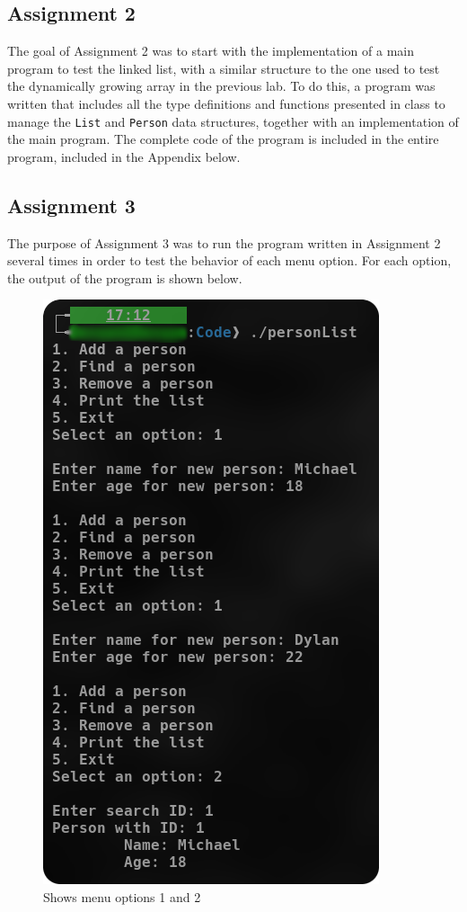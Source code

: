 \documentclass[
	letterpaper, %
	10pt, %
]{CSUniSchoolLabReport}
\begin{document}
\subsection{Assignment 2}

The goal of Assignment 2 was to start with the implementation of a main program to test the linked list, with a similar structure to the one used to test the dynamically growing array in the previous lab. To do this, a program was written that includes all the type definitions and functions presented in class to manage the \texttt{List} and \texttt{Person} data structures, together with an implementation of the main program. The complete code of the program is included in the entire program, included in the Appendix below.

\subsection{Assignment 3}

The purpose of Assignment 3 was to run the program written in Assignment 2 several times in order to test the behavior of each menu option. For each option, the output of the program is shown below.

\begin{figure}[H]
  \centering
  \includegraphics[width=.6\textwidth]{Figures/Assign3.png}
  \caption{Shows menu options 1 and 2}
  \label{fig:4}
\end{figure}
\end{document}
